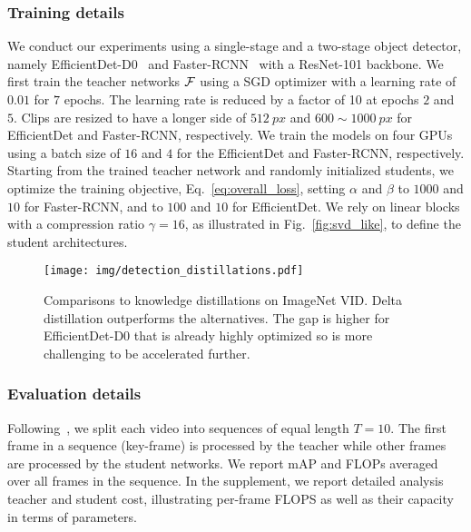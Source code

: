 \documentclass[runningheads]{llncs}
\begin{document}
\subsubsection{Training details}
We conduct our experiments using a single-stage and a two-stage object detector, namely EfficientDet-D0~\cite{efficientdet} and Faster-RCNN~\cite{fasterrcnn} with a ResNet-101 backbone.
We first train the teacher networks $\mathcal{F}$ using a SGD optimizer with a learning rate of $0.01$ for $7$ epochs. The learning rate is reduced by a factor of 10 at epochs $2$ and $5$. Clips are resized to have a longer side of $512~px$ and $600\sim1000~px$ for EfficientDet and Faster-RCNN, respectively. We train the models on four GPUs using a batch size of $16$ and $4$ for the EfficientDet and Faster-RCNN, respectively.
Starting from the trained teacher network and randomly initialized students, we optimize the training objective, Eq.~\ref{eq:overall_loss}, setting $\alpha$ and $\beta$ to $1000$ and $10$ for Faster-RCNN, and to $100$ and $10$ for EfficientDet. We rely on linear blocks with a compression ratio $\gamma=16$, as illustrated in Fig.~\ref{fig:svd_like}, to define the student architectures.
\begin{figure}[t!]
\centering
\texttt{[image: img/detection\_distillations.pdf]}
\caption{Comparisons to knowledge distillations on ImageNet VID. Delta distillation outperforms the alternatives. The gap is higher for EfficientDet-D0 that is already highly optimized so is more challenging to be accelerated further.}
\label{fig:feature_vs_delta}
\vspace{-4mm}
\end{figure} \subsubsection{Evaluation details}
Following~\cite{zhu17dff}, we split each video into sequences of equal length $T=10$. The first frame in a sequence (key-frame) is processed by the teacher while other frames are processed by the student networks. We report mAP and FLOPs averaged over all frames in the sequence.
In the supplement, we report detailed analysis teacher and student cost, illustrating per-frame FLOPS as well as their capacity in terms of parameters.
\end{document}
